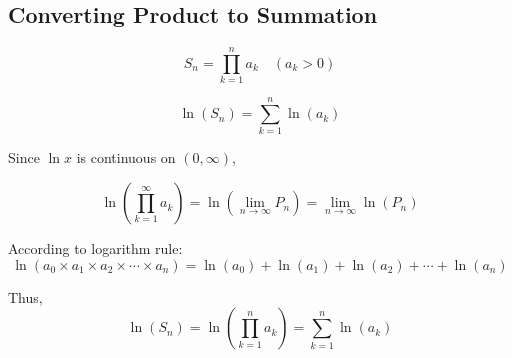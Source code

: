 \documentclass[12pt]{article}
\begin{document}
	\fancyhf{}
	
	\subsection*{Converting Product to Summation }
	$$
	S_n=\prod_{k=1}^{n} a_k \quad (a_k>0)
	$$
	
	$$
	\ln(S_n)=\sum_{k=1}^{n}\ln(a_k)
	$$
	
	Since \(\ln x\) is continuous on \((0,\infty)\),
	
	$$
	\ln\left(\prod_{k=1}^{\infty} a_k\right)
	=
	\ln\left(\lim_{n\to\infty}P_n\right)
	=
	\lim_{n\to\infty}\ln(P_n)
	$$
	
	According to logarithm rule:
	$$\ln(a_0\times a_1\times a_2\times \cdots\times a_n)=\ln(a_0)+\ln(a_1)+\ln(a_2)+\cdots+\ln(a_n)$$
	
	Thus, 
	$$
	\ln(S_n)=\ln\left(\prod_{k=1}^{n} a_k\right)=\sum_{k=1}^{n}\ln(a_k)
	$$
	
	
\end{document}
